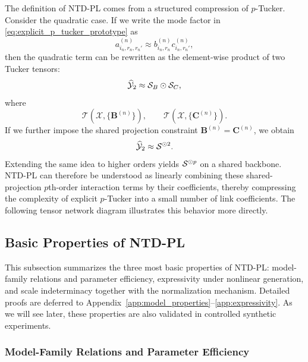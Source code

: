 The definition of NTD-PL comes from a structured compression of $p$-Tucker. Consider the quadratic case. If we write the mode factor in \eqref{eq:explicit_p_tucker_prototype} as
\begin{equation}
 a^{(n)}_{i_n,r_n,r_n'} \approx b^{(n)}_{i_n,r_n}c^{(n)}_{i_n,r_n'},
\end{equation}
then the quadratic term can be rewritten as the element-wise product of two Tucker tensors:
\begin{equation}
\label{eq:separable_quadratic_factorization}
\widehat{\mathcal{Y}}_2 \approx \mathcal{S}_B \odot \mathcal{S}_C,
\end{equation}
where
\begin{equation}
\mathcal{T}(\mathcal{X},\{\mathbf{B}^{(n)}\}),
\qquad
\mathcal{T}(\mathcal{X},\{\mathbf{C}^{(n)}\}).
\end{equation}
If we further impose the shared projection constraint $\mathbf B^{(n)}=\mathbf C^{(n)}$, we obtain
\begin{equation}
\label{eq:shared_quadratic_term}
\widehat{\mathcal{Y}}_2 \approx \mathcal{S}^{\odot 2}.
\end{equation}
Extending the same idea to higher orders yields $\mathcal{S}^{\odot p}$ on a shared backbone. NTD-PL can therefore be understood as linearly combining these shared-projection $p$th-order interaction terms by their coefficients, thereby compressing the complexity of explicit $p$-Tucker into a small number of link coefficients. The following tensor network diagram illustrates this behavior more directly.
\begin{center}
\resizebox{\linewidth}{!}{}
\end{center}

\subsection{Basic Properties of NTD-PL}

This subsection summarizes the three most basic properties of NTD-PL: model-family relations and parameter efficiency, expressivity under nonlinear generation, and scale indeterminacy together with the normalization mechanism. Detailed proofs are deferred to Appendix~\ref{app:model_properties}--\ref{app:expressivity}. As we will see later, these properties are also validated in controlled synthetic experiments.

\subsubsection{Model-Family Relations and Parameter Efficiency}

